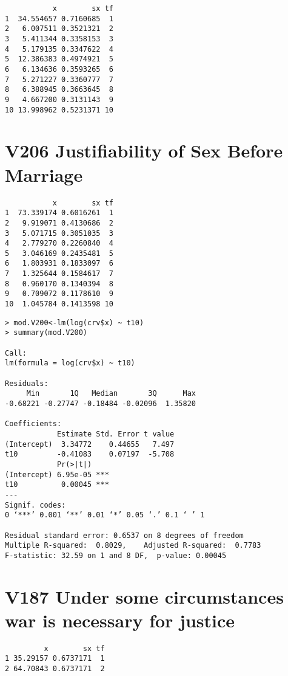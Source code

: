 \documentclass{amsart}
\begin{document}
\begin{verbatim}
           x        sx tf
1  34.554657 0.7160685  1
2   6.007511 0.3521321  2
3   5.411344 0.3358153  3
4   5.179135 0.3347622  4
5  12.386383 0.4974921  5
6   6.134636 0.3593265  6
7   5.271227 0.3360777  7
8   6.388945 0.3663645  8
9   4.667200 0.3131143  9
10 13.998962 0.5231371 10
\end{verbatim}

\section{V206 Justifiability of Sex Before Marriage}

\begin{verbatim}
           x        sx tf
1  73.339174 0.6016261  1
2   9.919071 0.4130686  2
3   5.071715 0.3051035  3
4   2.779270 0.2260840  4
5   3.046169 0.2435481  5
6   1.803931 0.1833097  6
7   1.325644 0.1584617  7
8   0.960170 0.1340394  8
9   0.709072 0.1178610  9
10  1.045784 0.1413598 10
\end{verbatim}



\begin{verbatim}
> mod.V200<-lm(log(crv$x) ~ t10)
> summary(mod.V200)

Call:
lm(formula = log(crv$x) ~ t10)

Residuals:
     Min       1Q   Median       3Q      Max 
-0.68221 -0.27747 -0.18484 -0.02096  1.35820 

Coefficients:
            Estimate Std. Error t value
(Intercept)  3.34772    0.44655   7.497
t10         -0.41083    0.07197  -5.708
            Pr(>|t|)    
(Intercept) 6.95e-05 ***
t10          0.00045 ***
---
Signif. codes:  
0 ‘***’ 0.001 ‘**’ 0.01 ‘*’ 0.05 ‘.’ 0.1 ‘ ’ 1

Residual standard error: 0.6537 on 8 degrees of freedom
Multiple R-squared:  0.8029,	Adjusted R-squared:  0.7783 
F-statistic: 32.59 on 1 and 8 DF,  p-value: 0.00045
\end{verbatim}


\section{V187 Under some circumstances war is necessary for justice}

\begin{verbatim}
         x        sx tf
1 35.29157 0.6737171  1
2 64.70843 0.6737171  2
\end{verbatim}
\end{document}
